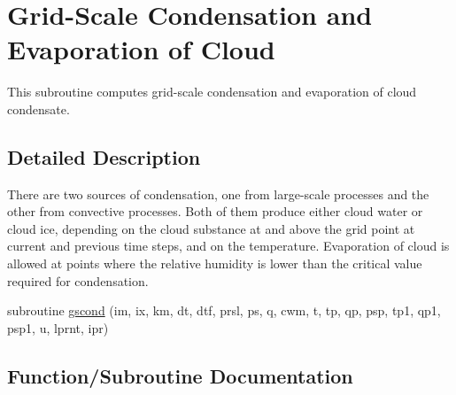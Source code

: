 \hypertarget{group__condense}{}\section{Grid-\/\+Scale Condensation and Evaporation of Cloud}
\label{group__condense}


This subroutine computes grid-\/scale condensation and evaporation of cloud condensate.  




\subsection{Detailed Description}
There are two sources of condensation, one from large-\/scale processes and the other from convective processes. Both of them produce either cloud water or cloud ice, depending on the cloud substance at and above the grid point at current and previous time steps, and on the temperature. Evaporation of cloud is allowed at points where the relative humidity is lower than the critical value required for condensation. \begin{DoxyCompactItemize}
\item 
subroutine \hyperlink{group__condense_gac51672b28449a810caf82a7292078ccf}{gscond} (im, ix, km, dt, dtf, prsl, ps, q, cwm, t, tp, qp, psp, tp1, qp1, psp1, u, lprnt, ipr)
\end{DoxyCompactItemize}


\subsection{Function/\+Subroutine Documentation}
\mbox{\label{group__condense_gac51672b28449a810caf82a7292078ccf}} 
